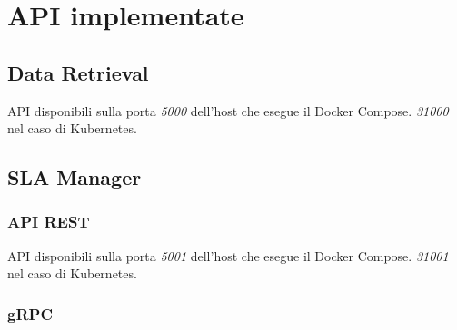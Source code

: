 \documentclass{article}
\begin{document}
\section{API implementate}
\subsection{Data Retrieval}
API disponibili sulla porta \textit{5000} dell'host che esegue il Docker Compose. \textit{31000} nel caso di Kubernetes.
\label{api:data_retrieval}
    
\newpage
\subsection{SLA Manager}
    \subsubsection{API REST}
    API disponibili sulla porta \textit{5001} dell'host che esegue il Docker Compose. \textit{31001} nel caso di Kubernetes.
    \label{api:sla_manager}
        
    \subsubsection{gRPC}
        \SetProtoColorsBlueish
        
\end{document}
